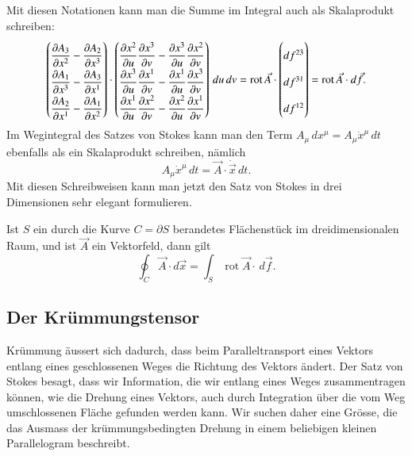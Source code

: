 Mit diesen Notationen kann man die Summe im Integral auch als Skalaprodukt
schreiben:
\[
{
\def\arraystretch{2.0}
\begin{pmatrix}
\displaystyle
\frac{\partial A_3}{\partial x^2}-\frac{\partial A_2}{\partial x^3}\\
\displaystyle
\frac{\partial A_1}{\partial x^3}-\frac{\partial A_3}{\partial x^1}\\
\displaystyle
\frac{\partial A_2}{\partial x^1}-\frac{\partial A_1}{\partial x^2}
\end{pmatrix}
\cdot
\begin{pmatrix}
\displaystyle
\frac{\partial x^2}{\partial u}\frac{\partial x^3}{\partial v}
-
\frac{\partial x^3}{\partial u}\frac{\partial x^2}{\partial v}
\\
\displaystyle
\frac{\partial x^3}{\partial u}\frac{\partial x^1}{\partial v}
-
\frac{\partial x^1}{\partial u}\frac{\partial x^3}{\partial v}
\\
\displaystyle
\frac{\partial x^1}{\partial u}\frac{\partial x^2}{\partial v}
-
\frac{\partial x^2}{\partial u}\frac{\partial x^1}{\partial v}
\end{pmatrix}
\,du\,dv
}
=
\operatorname{rot}\vec A\cdot
\begin{pmatrix}
df^{23}\\
df^{31}\\
df^{12}
\end{pmatrix}
=
\operatorname{rot}\vec A
\cdot
d\vec f.
\]
Im Wegintegral des Satzes von Stokes kann man den Term 
$A_\mu\,dx^\mu=A_\mu \dot x^\mu\,dt$ ebenfalls als ein
Skalaprodukt schreiben, nämlich
\[
A_\mu \dot x^\mu\,dt = \vec A\cdot \dot{\vec x}\,dt.
\]
Mit diesen Schreibweisen kann man jetzt den Satz von Stokes in
drei Dimensionen sehr elegant formulieren.

\begin{satz}[Stokes]
Ist $S$ ein durch die Kurve $C=\partial S$ berandetes Flächenstück
im dreidimensionalen Raum, und ist $\vec A$ ein Vektorfeld, dann gilt
\[
\oint_C \vec A\cdot d\vec{x} = \int_S\operatorname{rot}\vec A\cdot \,d\vec f.
\]
\end{satz}

\subsection{Der Krümmungstensor%
\label{skript:kruemmung:section:kruemmungstensor}}
Krümmung äussert sich dadurch, dass beim Paralleltransport eines Vektors
entlang eines geschlossenen Weges die Richtung des Vektors ändert.
Der Satz von Stokes besagt, dass wir Information, die wir entlang eines
Weges zusammentragen können, wie die Drehung eines Vektors, auch durch
Integration über die vom Weg umschlossenen Fläche gefunden werden kann.
Wir suchen daher eine Grösse, die das Ausmass der krümmungsbedingten
Drehung in einem beliebigen kleinen Parallelogram beschreibt.

